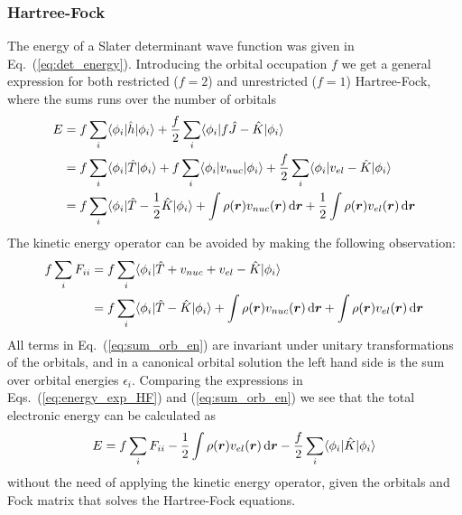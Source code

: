 \subsubsection{Hartree-Fock}
The energy of a Slater determinant wave function was given in Eq.~(\ref{eq:det_energy}).
Introducing the orbital occupation $f$ we get a general expression for
both restricted ($f=2$) and unrestricted ($f=1$) Hartree-Fock, where the sums runs over the
number of orbitals
\begin{align}
    E	&= f \sum_i \langle \phi_i|\hat{h}|\phi_i \rangle
	    + \frac{f}{2} \sum_i \langle \phi_i|f\hat{J} - \hat{K}|\phi_i \rangle\\
	&= f \sum_i \langle \phi_i|\hat{T}|\phi_i \rangle
	    + f \sum_i \langle \phi_i|v_{nuc}|\phi_i \rangle
	    + \frac{f}{2} \sum_i \langle \phi_i|v_{el} - \hat{K}|\phi_i \rangle \\
	&= f \sum_i \langle \phi_i|\hat{T} - \frac{1}{2}\hat{K}|\phi_i \rangle
	    + \int \rho(\boldsymbol r)v_{nuc}(\boldsymbol r) \,\mathrm{d}\boldsymbol r
	    + \frac{1}{2} \int \rho(\boldsymbol r)v_{el}(\boldsymbol r) \,\mathrm{d}\boldsymbol r
\end{align}
The kinetic energy operator can be avoided by making the following observation:
\begin{align}
    \label{eq:sum_orb_en}
    f \sum_i F_{ii} &= f \sum_i \langle\phi_i|\hat{T} + v_{nuc} + v_{el} - \hat{K}|\phi_i\rangle\\
		    &= f \sum_i \langle\phi_i|\hat{T} - \hat{K}|\phi_i\rangle
		     + \int \rho(\boldsymbol r)v_{nuc}(\boldsymbol r) \,\mathrm{d}\boldsymbol r
		     + \int \rho(\boldsymbol r)v_{el}(\boldsymbol r) \,\mathrm{d}\boldsymbol r
\end{align}
All terms in Eq.~(\ref{eq:sum_orb_en}) are invariant under unitary transformations of the orbitals,
and in a canonical orbital solution the left hand side is the sum over orbital energies $\epsilon_i$.
Comparing the expressions in Eqs.~(\ref{eq:energy_exp_HF}) and (\ref{eq:sum_orb_en}) we see that
the total electronic energy can be calculated as
\begin{equation}
    E = f \sum_i F_{ii} - \frac{1}{2} \int \rho(\boldsymbol r)v_{el}(\boldsymbol r) \,\mathrm{d}\boldsymbol r
	- \frac{f}{2} \sum_i \langle\phi_i|\hat{K}|\phi_i\rangle
\end{equation}
without the need of applying the kinetic energy operator, given the orbitals and Fock matrix that
solves the Hartree-Fock equations.


